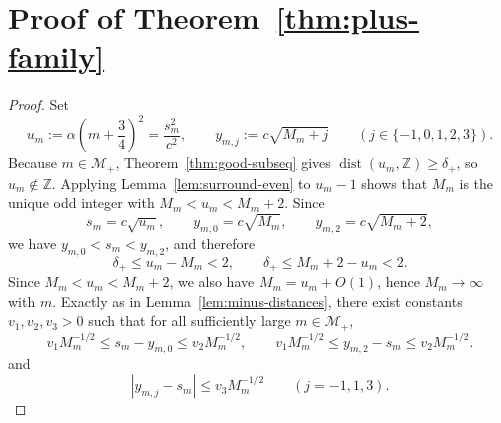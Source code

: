 \documentclass[reqno]{amsart}
\theoremstyle{definition}
\theoremstyle{plain}
\theoremstyle{remark}
\numberwithin{equation}{section}
\newcommand{\Z}{\mathbb{Z}}
\newcommand{\dist}{\operatorname{dist}}
\begin{document}
\section{Proof of Theorem~\ref{thm:plus-family}}\label{sec:proof-plus-family}

\begin{proof}
Set
\[
  u_m:=\alpha\left(m+\frac34\right)^2=\frac{s_m^2}{c^2},
  \qquad
  y_{m,j}:=c\sqrt{M_m+j}\qquad (j\in\{-1,0,1,2,3\}).
\]
Because $m\in\mathcal M_+$, Theorem~\ref{thm:good-subseq} gives $\dist(u_m,\Z)\ge \delta_+$, so $u_m\notin\Z$. Applying Lemma~\ref{lem:surround-even} to $u_m-1$ shows that $M_m$ is the unique odd integer with $M_m<u_m<M_m+2$. Since
\[
  s_m=c\sqrt{u_m},
  \qquad
  y_{m,0}=c\sqrt{M_m},
  \qquad
  y_{m,2}=c\sqrt{M_m+2},
\]
we have $y_{m,0}<s_m<y_{m,2}$, and therefore
\[
  \delta_+\le u_m-M_m<2,
  \qquad
  \delta_+\le M_m+2-u_m<2.
\]
Since $M_m<u_m<M_m+2$, we also have $M_m=u_m+O(1)$, hence $M_m\to\infty$ with $m$. Exactly as in Lemma~\ref{lem:minus-distances}, there exist constants $v_1,v_2,v_3>0$ such that for all sufficiently large $m\in\mathcal M_+$,
\begin{equation}\label{eq:plus-endpoint-distance}
  v_1M_m^{-1/2}\le s_m-y_{m,0}\le v_2M_m^{-1/2},
  \qquad
  v_1M_m^{-1/2}\le y_{m,2}-s_m\le v_2M_m^{-1/2}.
\end{equation}
and
\begin{equation}\label{eq:plus-middle-distance}
  |y_{m,j}-s_m|\le v_3M_m^{-1/2}
  \qquad (j=-1,1,3).
\end{equation}


\end{proof}
\end{document}
